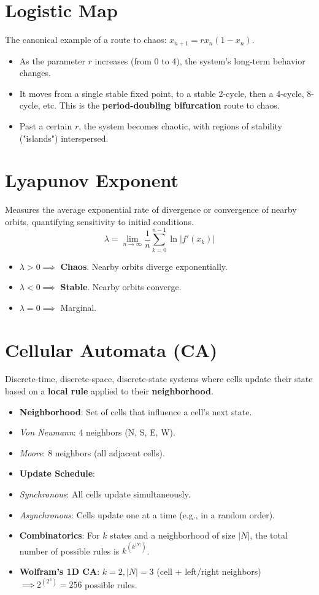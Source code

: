 \documentclass[8pt,a4paper,twocolumn]{article}
\newcommand{\0}{\mathbf{0}}
\begin{document}
\section*{Logistic Map}
The canonical example of a route to chaos: $x_{n+1} = r x_n (1 - x_n)$.
\begin{itemize}
    \item As the parameter $r$ increases (from 0 to 4), the system's long-term behavior changes.
    \item It moves from a single stable fixed point, to a stable 2-cycle, then a 4-cycle, 8-cycle, etc. This is the \textbf{period-doubling bifurcation} route to chaos.
    \item Past a certain $r$, the system becomes chaotic, with regions of stability ("islands") interspersed.
\end{itemize}

\section*{Lyapunov Exponent}
Measures the average exponential rate of divergence or convergence of nearby orbits, quantifying sensitivity to initial conditions.
\[ 
 \lambda = \lim_{n \to \infty} \frac{1}{n} \sum_{k=0}^{n-1} \ln|f'(x_k)| 
\]
\begin{itemize}
    \item $\lambda > 0 \implies$ \textbf{Chaos}. Nearby orbits diverge exponentially.
    \item $\lambda < 0 \implies$ \textbf{Stable}. Nearby orbits converge.
    \item $\lambda = 0 \implies$ Marginal.
\end{itemize}

\section*{Cellular Automata (CA)}
Discrete-time, discrete-space, discrete-state systems where cells update their state based on a \textbf{local rule} applied to their \textbf{neighborhood}.
\begin{itemize}
    \item \textbf{Neighborhood}: Set of cells that influence a cell's next state.
        \item \textit{Von Neumann}: 4 neighbors (N, S, E, W).
        \item \textit{Moore}: 8 neighbors (all adjacent cells).
    \item \textbf{Update Schedule}:
        \item \textit{Synchronous}: All cells update simultaneously.
        \item \textit{Asynchronous}: Cells update one at a time (e.g., in a random order).
    \item \textbf{Combinatorics}: For $k$ states and a neighborhood of size $|N|$, the total number of possible rules is $k^{(k^{|N|})}$.
    \item \textbf{Wolfram's 1D CA}: $k=2, |N|=3$ (cell + left/right neighbors) $\implies 2^{(2^3)} = 256$ possible rules.
\end{itemize}
\end{document}
